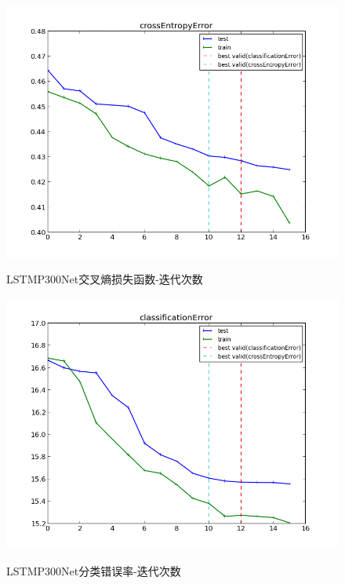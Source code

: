  
\begin{figure}[htb]
  \centering
  \includegraphics[scale=0.6]{Pictures/LSTM/crossentropy.png}\\
  \caption{LSTMP300Net交叉熵损失函数-迭代次数}\label{Fig:LSTMP300Net_cross}
\end{figure}


\begin{figure}[htb]
  \centering
  \includegraphics[scale=0.6]{Pictures/LSTM/classificationError.png}\\
  \caption{LSTMP300Net分类错误率-迭代次数}\label{Fig:LSTMP300Net_class}
\end{figure}

